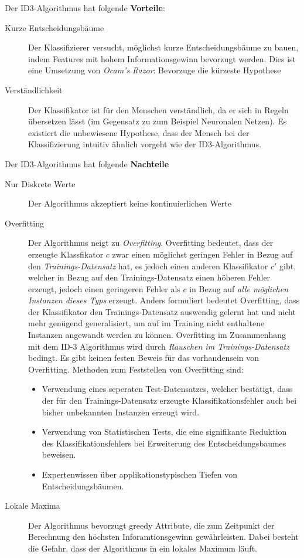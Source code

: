 Der ID3-Algorithmus hat folgende \textbf{Vorteile}:

\begin{description}
\item[Kurze Entscheidungsbäume] Der Klassifizierer versucht, möglichst kurze Entscheidungsbäume zu bauen, indem Features mit hohem Informationsgewinn bevorzugt werden. Dies ist eine Umsetzung von \emph{Ocam's Razor}: \glqq Bevorzuge die kürzeste Hypothese\grqq{}
\item[Verständlichkeit]  Der Klassifikator ist für den Menschen verständlich, da er sich in Regeln übersetzen lässt (im Gegensatz zu zum Beispiel Neuronalen Netzen). Es existiert die unbewiesene Hypothese, dass der Mensch bei der Klassifizierung intuitiv ähnlich vorgeht wie der ID3-Algorithmus.\cite[S. 63 - 65]{machine_mitchell}
\end{description}

Der ID3-Algorithmus hat folgende \textbf{Nachteile}
\begin{description}
	\item[Nur Diskrete Werte] Der Algorithmus akzeptiert keine kontinuierlichen Werte \cite[S. 72]{machine_mitchell}
	\item[Overfitting] Der Algorithmus neigt zu \emph{Overfitting}. Overfitting bedeutet, dass der erzeugte Klassfikator $c$ zwar einen möglichst geringen Fehler in Bezug auf den \emph{Trainings-Datensatz} hat, es jedoch einen anderen Klassifikator $c'$ gibt, welcher in Bezug auf den Trainings-Datensatz einen höheren Fehler erzeugt, jedoch einen geringeren Fehler als $c$ in Bezug auf \emph{alle möglichen Instanzen dieses Typs} erzeugt. Anders formuliert bedeutet Overfitting, dass der Klassifikator den Trainings-Datensatz \glqq auswendig gelernt hat\grqq{} und nicht mehr genügend generalisiert, um auf im Training nicht enthaltene Instanzen angewandt werden zu können. Overfitting im Zusammenhang mit dem ID-3 Algorithmus wird durch \emph{Rauschen im Trainings-Datensatz} bedingt. Es gibt keinen festen Beweis für das vorhandensein von Overfitting. Methoden zum Feststellen von Overfitting sind:
	\begin{itemize}
		\item Verwendung eines seperaten Test-Datensatzes, welcher bestätigt, dass der für den Trainings-Datensatz erzeugte Klassifikationsfehler auch bei bisher unbekannten Instanzen erzeugt wird.
		\item Verwendung von Statistischen Tests, die eine signifikante Reduktion des Klassifikationsfehlers bei Erweiterung des Entscheidungsbaumes beweisen.
		\item Expertenwissen über applikationstypischen Tiefen von Entscheidungsbäumen.\cite[S. 66 - 70]{machine_mitchell}
	\end{itemize}
	\item[Lokale Maxima] Der Algorithmus bevorzugt greedy Attribute, die zum Zeitpunkt der Berechnung den höchsten Inforamtionsgewinn gewährleisten. Dabei besteht die Gefahr, dass der Algorithmus in ein lokales Maximum läuft.\cite[S. 66 - 70]{machine_mitchell}
\end{description}

